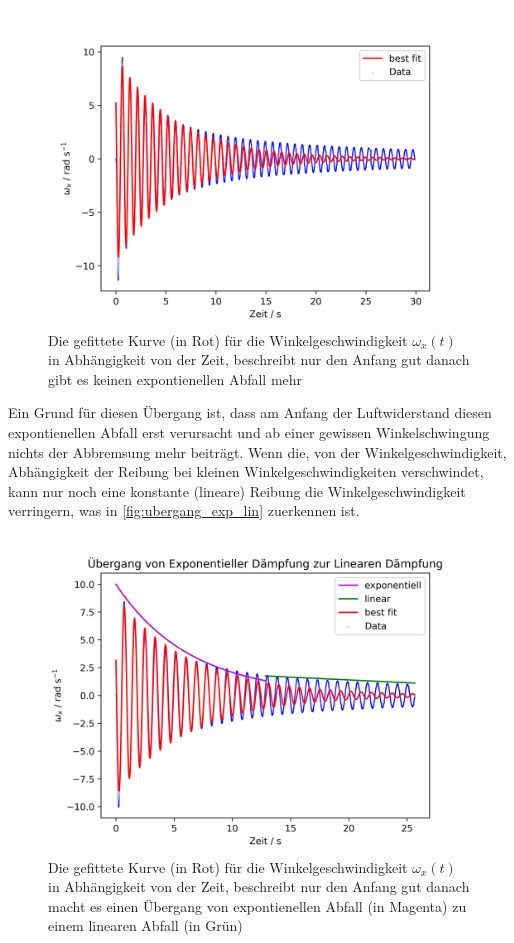 \documentclass[11pt,ngerman]{scrartcl}
\begin{document}
\begin{figure}[H]
    \centering
    \includegraphics[width=0.8\linewidth]{pics/nonexp.png}
    \caption{Die gefittete Kurve (in Rot) für die Winkelgeschwindigkeit $\omega_x(t)$ 
    in Abhängigkeit von der Zeit, beschreibt nur den Anfang gut danach gibt
    es keinen expontienellen Abfall mehr}%
    \label{fig:nonexp}
\end{figure}

Ein Grund für diesen Übergang ist, dass am Anfang der Luftwiderstand
diesen expontienellen Abfall erst verursacht und ab einer gewissen
Winkelschwingung nichts der Abbremsung mehr beiträgt. Wenn die,
von der Winkelgeschwindigkeit, Abhängigkeit der Reibung bei
kleinen Winkelgeschwindigkeiten verschwindet, kann nur noch eine
konstante (lineare) Reibung die Winkelgeschwindigkeit verringern,
was in \autoref{fig:ubergang_exp_lin} zuerkennen ist.

\begin{figure}[H]
    \centering
    \includegraphics[width=0.8\linewidth]{pics/ubergang_exp_lin.png}
    \caption{Die gefittete Kurve (in Rot) für die Winkelgeschwindigkeit $\omega_x(t)$ 
    in Abhängigkeit von der Zeit, beschreibt nur den Anfang gut danach macht es
    einen Übergang von expontienellen Abfall (in Magenta) zu einem linearen Abfall
    (in Grün)}%
    \label{fig:ubergang_exp_lin}
\end{figure}
\end{document}
